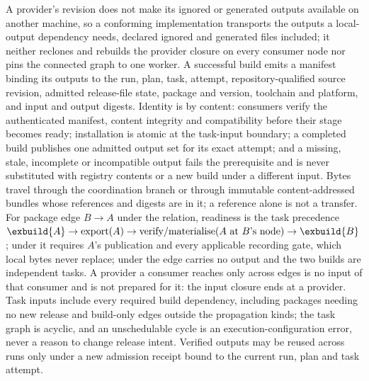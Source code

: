 \begin{definition}
\label{def:exec-outputs}
A provider's revision does not make its ignored or generated outputs
available on another machine, so a conforming implementation transports the
outputs a local-output dependency needs, declared ignored and generated files
included; it neither reclones and rebuilds the provider closure on every
consumer node nor pins the connected graph to one worker. A successful build
emits a manifest binding its outputs to the run, plan, task, attempt,
repository-qualified source revision, admitted release-file state, package and
version, toolchain and platform, and input and output digests. Identity is by
content: consumers verify the authenticated manifest, content integrity and
compatibility before their stage becomes ready; installation is atomic at the
task-input boundary; a completed build publishes one admitted output set for
its exact attempt; and a missing, stale, incomplete or incompatible output
fails the prerequisite and is never substituted with registry contents or a
new build under a different input. Bytes travel through the coordination
branch or through immutable content-addressed bundles whose references and
digests are in it; a reference alone is not a transfer. For package edge $B
\to A$ under the  relation, readiness is the task precedence
$\exbuild{A} \to \mathrm{export}(A) \to \mathrm{verify/materialise}(A
\text{ at } B\text{'s node}) \to \exbuild{B}$; under  it
requires $A$'s publication and every applicable recording gate, which local
bytes never replace; under  the edge carries no output and the two
builds are independent tasks. A provider a consumer reaches only across
 edges is no input of that consumer and is not prepared for it:
the input closure ends at a  provider. Task inputs include every
required build dependency, including packages needing no new release and
build-only edges outside the propagation kinds; the task graph is acyclic,
and an unschedulable cycle is an execution-configuration error, never a
reason to change release intent. Verified outputs may be reused across runs
only under a new admission receipt bound to the current run, plan and task
attempt.
\end{definition}

